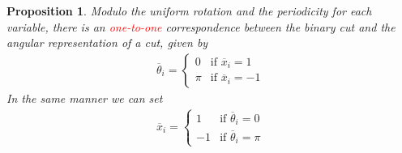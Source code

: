 \documentclass[12pt,a4paper]{article}
\theoremstyle{mythm}
\newtheorem{prop}[thm]{Proposition}
\begin{document}
\begin{prop}
Modulo the uniform rotation and the periodicity for each variable, there is an \textcolor{red}{one-to-one} correspondence between the binary cut and the angular representation
of a cut, given by
\begin{align}
\label{eq:ass1to1} 
\overline{ \theta } _{ i } = \begin{cases}
0 & \text{if } \overline{ x } _{ i } = 1 \\
\pi & \text{if } \overline{ x } _{ i } = -1
\end{cases}
\end{align} 
In the same manner we can set
\begin{align*}
\overline{ x } _{ i } = \begin{cases}
1 & \text{if } \overline{ \theta } _{ i } = 0 \\
-1 & \text{if } \overline{ \theta } _{ i  } = \pi
\end{cases}
\end{align*} 
\end{prop} 
\end{document}
